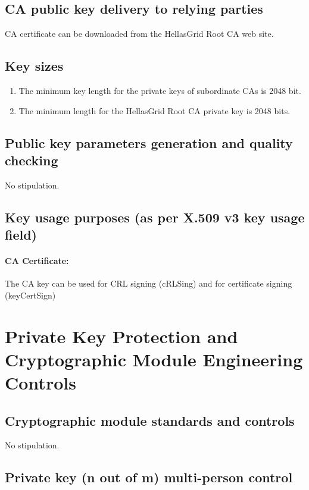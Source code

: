\documentclass[11pt,a4paper,titlepage]{book}
\begin{document}
\subsection{CA public key delivery to relying parties}


CA certificate can be downloaded from the HellasGrid Root CA web site.

\subsection{Key sizes}

\begin{enumerate}
\item{The minimum key length for the private keys of subordinate CAs is 2048 bit.}
\item{The minimum length for the HellasGrid Root CA private key is 2048 bits.}
\end{enumerate}

\subsection{Public key parameters generation and quality checking}

No stipulation.

\subsection{Key usage purposes (as per X.509 v3 key usage field)}

\paragraph{CA Certificate:} The CA key can be used for CRL signing (cRLSing) and for certificate signing (keyCertSign)


\section{Private Key Protection and Cryptographic Module Engineering Controls}
\subsection{Cryptographic module standards and controls}

No stipulation. 

\subsection{Private key (n out of m) multi-person control}
\end{document}
